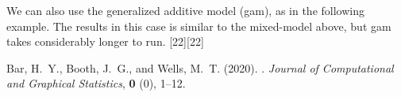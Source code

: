 \documentclass[a4paper,10pt]{article}
\begin{document}
We can also use the generalized additive model (gam), as in the following example. The results in this case is similar to the mixed-model above, but gam takes considerably longer to run.
[22][22]





\begin{thebibliography}{99}
{\rm Bar, H.~Y., Booth, J.~G., {\rm and} Wells, M.~T.} (2020).
.
\newblock \emph{Journal of Computational and Graphical Statistics}, {\bf  0} (0),  1--12.
\end{thebibliography}
\end{document}
